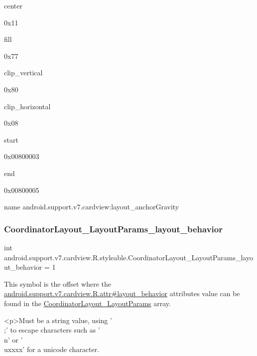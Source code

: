 {\ttfamily center}

0x11

{\ttfamily fill}

0x77

{\ttfamily clip\+\_\+vertical}

0x80

{\ttfamily clip\+\_\+horizontal}

0x08

{\ttfamily start}

0x00800003

{\ttfamily end}

0x00800005

name android.\+support.\+v7.\+cardview\+:layout\+\_\+anchor\+Gravity \mbox{\label{classandroid_1_1support_1_1v7_1_1cardview_1_1R_1_1styleable_a7b12af163a68314e93350a2fddb194d5}} 
\subsubsection{\texorpdfstring{Coordinator\+Layout\+\_\+\+Layout\+Params\+\_\+layout\+\_\+behavior}{CoordinatorLayout\_LayoutParams\_layout\_behavior}}
{\footnotesize\ttfamily int android.\+support.\+v7.\+cardview.\+R.\+styleable.\+Coordinator\+Layout\+\_\+\+Layout\+Params\+\_\+layout\+\_\+behavior = 1\hspace{0.3cm}{\ttfamily [static]}}

This symbol is the offset where the \hyperlink{classandroid_1_1support_1_1v7_1_1cardview_1_1R_1_1attr_a407bbdce0d48daa5f8c2bf959a52d866}{android.\+support.\+v7.\+cardview.\+R.\+attr\#layout\+\_\+behavior} attribute\textquotesingle{}s value can be found in the \hyperlink{classandroid_1_1support_1_1v7_1_1cardview_1_1R_1_1styleable_afac1c5752b8eb35d30db48df7a9eea89}{Coordinator\+Layout\+\_\+\+Layout\+Params} array.

\begin{DoxyVerb}      <p>Must be a string value, using '\\;' to escape characters such as '\\n' or '\\uxxxx' for a unicode character.
\end{DoxyVerb}
 

